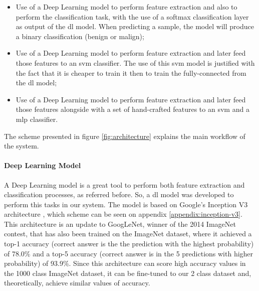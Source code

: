 \documentclass[
  twoside,
  11pt, a4paper,
  footinclude=true,
  headinclude=true,
  cleardoublepage=empty
]{scrbook}
\begin{document}
        \begin{itemize}
          \item Use of a Deep Learning model to perform feature extraction and also to perform the classification task, with the use of a softmax classification layer as output of the \gls{dl} model. When predicting a sample, the model will produce a binary classification (benign or malign);
          \item Use of a Deep Learning model to perform feature extraction and later feed those features to an \gls{svm} classifier. The use of this \gls{svm} model is justified with the fact that it is cheaper to train it then to train the fully-connected from the \gls{dl} model;
          \item Use of a Deep Learning model to perform feature extraction and later feed those features alongside with a set of hand-crafted features to an \gls{svm} and a \gls{mlp} classifier.
        \end{itemize}

        The scheme presented in figure \ref{fig:architecture} explains the main workflow of the system.


        \paragraph{Deep Learning Model}
          A Deep Learning model is a great tool to perform both feature extraction and classification processes, as referred before. So, a \gls{dl} model was developed to perform this tasks in our system. The model is based on Google's Inception V3 architecture \cite{szegedy2015rethinking}, which scheme can be seen on appendix \ref{appendix:inception-v3}. This architecture is an update to GoogLeNet, winner of the 2014 ImageNet contest, that has also been trained on the ImageNet dataset, where it achieved a top-1 accuracy (correct answer is the the prediction with the highest probability) of 78.0\% and a top-5 accuracy (correct answer is in the 5 predictions with higher probability) of 93.9\%. Since this architecture can score high accuracy values in the 1000 class ImageNet dataset, it can be fine-tuned to our 2 class dataset and, theoretically, achieve similar values of accuracy.
\end{document}
